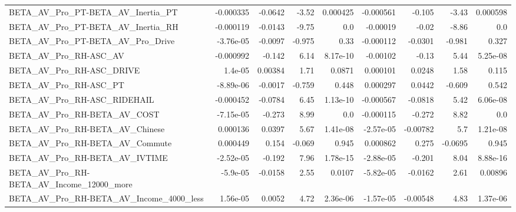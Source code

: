 \begin{tabular}{lrrrrrrrr}
BETA\_AV\_Pro\_PT-BETA\_AV\_Inertia\_PT                  &   -0.000335 &      -0.0642 &    -3.52 & 0.000425 &  -0.000561 &      -0.105 &        -3.43 &      0.000598 \\
BETA\_AV\_Pro\_PT-BETA\_AV\_Inertia\_RH                  &   -0.000119 &      -0.0143 &    -9.75 &      0.0 &   -0.00019 &       -0.02 &        -8.86 &           0.0 \\
BETA\_AV\_Pro\_PT-BETA\_AV\_Pro\_Drive                   &   -3.76e-05 &      -0.0097 &   -0.975 &     0.33 &  -0.000112 &     -0.0301 &       -0.981 &         0.327 \\
BETA\_AV\_Pro\_RH-ASC\_AV                              &   -0.000992 &       -0.142 &     6.14 & 8.17e-10 &   -0.00102 &       -0.13 &         5.44 &      5.25e-08 \\
BETA\_AV\_Pro\_RH-ASC\_DRIVE                           &     1.4e-05 &      0.00384 &     1.71 &   0.0871 &   0.000101 &      0.0248 &         1.58 &         0.115 \\
BETA\_AV\_Pro\_RH-ASC\_PT                              &   -8.89e-06 &      -0.0017 &   -0.759 &    0.448 &   0.000297 &      0.0442 &       -0.609 &         0.542 \\
BETA\_AV\_Pro\_RH-ASC\_RIDEHAIL                        &   -0.000452 &      -0.0784 &     6.45 & 1.13e-10 &  -0.000567 &     -0.0818 &         5.42 &      6.06e-08 \\
BETA\_AV\_Pro\_RH-BETA\_AV\_COST                        &   -7.15e-05 &       -0.273 &     8.99 &      0.0 &  -0.000115 &      -0.272 &         8.82 &           0.0 \\
BETA\_AV\_Pro\_RH-BETA\_AV\_Chinese                     &    0.000136 &       0.0397 &     5.67 & 1.41e-08 &  -2.57e-05 &    -0.00782 &          5.7 &      1.21e-08 \\
BETA\_AV\_Pro\_RH-BETA\_AV\_Commute                     &    0.000449 &        0.154 &   -0.069 &    0.945 &   0.000862 &       0.275 &      -0.0695 &         0.945 \\
BETA\_AV\_Pro\_RH-BETA\_AV\_IVTIME                      &   -2.52e-05 &       -0.192 &     7.96 & 1.78e-15 &  -2.88e-05 &      -0.201 &         8.04 &      8.88e-16 \\
BETA\_AV\_Pro\_RH-BETA\_AV\_Income\_12000\_more           &    -5.9e-05 &      -0.0158 &     2.55 &   0.0107 &  -5.82e-05 &     -0.0162 &         2.61 &       0.00896 \\
BETA\_AV\_Pro\_RH-BETA\_AV\_Income\_4000\_less            &    1.56e-05 &       0.0052 &     4.72 & 2.36e-06 &  -1.57e-05 &    -0.00548 &         4.83 &      1.37e-06 \\

\end{tabular}
